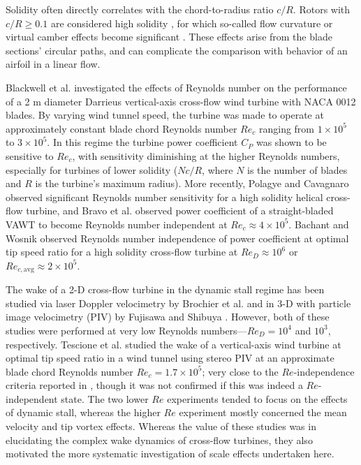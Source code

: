 \documentclass[energies,article,accept,moreauthors,pdftex,12pt,a4paper]{mdpi}
\begin{document}
Solidity often directly correlates with the chord-to-radius ratio $c/R$. Rotors
with $c/R \ge 0.1$ are considered high solidity \cite{Fiedler2009}, for which
so-called flow curvature or virtual camber effects become significant
\cite{Migliore1980}. These effects arise from the blade sections' circular
paths, and can complicate the comparison with behavior of an airfoil in a linear
flow.

Blackwell et al. \cite{Blackwell1976} investigated the effects of Reynolds
number on the performance of a 2 m diameter Darrieus vertical-axis cross-flow
wind turbine with NACA 0012 blades. By varying wind tunnel speed, the turbine
was made to operate at approximately constant blade chord Reynolds number $Re_c$
ranging from $1 \times 10^5$ to $3 \times 10^5$. In this regime the turbine
power coefficient $C_P$ was shown to be sensitive to $Re_c$, with sensitivity
diminishing at the higher Reynolds numbers, especially for turbines of lower
solidity ($Nc/R$, where $N$ is the number of blades and $R$ is the turbine's
maximum radius). More recently, Polagye and Cavagnaro \cite{Polagye2013b}
observed significant Reynolds number sensitivity for a high solidity helical
cross-flow turbine, and Bravo et al. \cite{Bravo2007} observed power coefficient
of a straight-bladed VAWT to become Reynolds number independent at $Re_c \approx
4 \times 10^5$. Bachant and Wosnik \cite{Bachant2014} observed Reynolds number
independence of power coefficient at optimal tip speed ratio for a high solidity
cross-flow turbine at $Re_D \approx 10^6$ or $Re_{c,\mathrm{avg}} \approx 2
\times 10^5$.

The wake of a 2-D cross-flow turbine in the dynamic stall regime has been
studied via laser Doppler velocimetry by Brochier et al. \cite{Brochier1986} and
in 3-D with particle image velocimetry (PIV) by Fujisawa and Shibuya
\cite{Fujisawa2001}. However, both of these studies were performed at very low
Reynolds numbers---$Re_D = 10^4$ and $10^3$, respectively. Tescione et al.
\cite{Tescione2014} studied the wake of a vertical-axis wind turbine at optimal
tip speed ratio in a wind tunnel using stereo PIV at an approximate blade chord
Reynolds number $Re_c = 1.7 \times 10^5$; very close to the $Re$-independence
criteria reported in \cite{Bachant2014}, though it was not confirmed if this was
indeed a $Re$-independent state. The two lower $Re$ experiments tended to focus
on the effects of dynamic stall, whereas the higher $Re$ experiment mostly
concerned the mean velocity and tip vortex effects. Whereas the value of these
studies was in elucidating the complex wake dynamics of cross-flow turbines,
they also motivated the more systematic investigation of scale effects
undertaken here.
\end{document}
